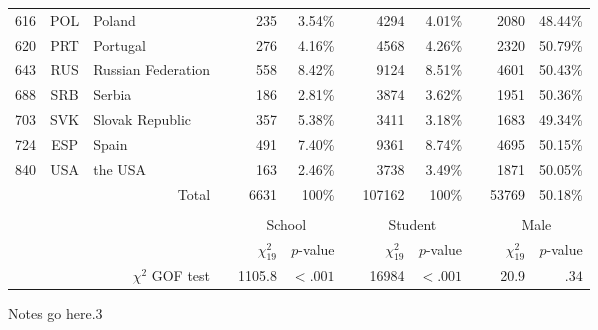 {\begin{tabular}{ccl c rr c rr c rr}
      616   & POL   & Poland &       & 235   & 3.54\% &       & 4294  & 4.01\% &       & 2080  & 48.44\% \\
      620   & PRT   & Portugal &       & 276   & 4.16\% &       & 4568  & 4.26\% &       & 2320  & 50.79\% \\
      643   & RUS   & Russian Federation &       & 558   & 8.42\% &       & 9124  & 8.51\% &       & 4601  & 50.43\% \\
      688   & SRB   & Serbia &       & 186   & 2.81\% &       & 3874  & 3.62\% &       & 1951  & 50.36\% \\
      703   & SVK   & Slovak Republic &       & 357   & 5.38\% &       & 3411  & 3.18\% &       & 1683  & 49.34\% \\
      724   & ESP   & Spain &       & 491   & 7.40\% &       & 9361  & 8.74\% &       & 4695  & 50.15\% \\
      840   & USA   & the USA &       & 163   & 2.46\% &       & 3738  & 3.49\% &       & 1871  & 50.05\% \\
      \midrule
            &       & \multicolumn{1}{r}{Total} &       & 6631  & 100\% &       & 107162 & 100\% &       & 53769 & 50.18\% \\
      &&&&&&&&&&&\\
      &&&& \multicolumn{2}{c}{School} &       & \multicolumn{2}{c}{Student} &       & \multicolumn{2}{c}{Male} \\
      \cmidrule{5-6}\cmidrule{8-9}\cmidrule{11-12}
      &&&& $\chi^2_{19}$ & $p$-value && $\chi^2_{19}$ & $p$-value && $\chi^2_{19}$ & $p$-value\\
      \midrule
      \multicolumn{3}{r}{$\chi^2$ GOF test} && 1105.8 & $<.001$ && 16984 & $<.001$ && 20.9 & $.34$
      \end{tabular}
}{Notes go here.}{3}